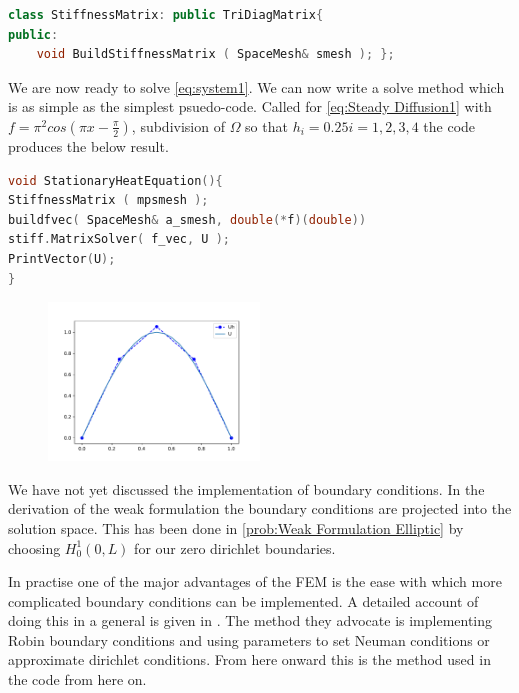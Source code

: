 \documentclass{uonmathreport}
\theoremstyle{definition}
\theoremstyle{problem}
\theoremstyle{theorem}
\begin{document}
\begin{lstlisting}[language=C++]
class StiffnessMatrix: public TriDiagMatrix{
public:
    void BuildStiffnessMatrix ( SpaceMesh& smesh ); };

\end{lstlisting}

We are now ready to solve \ref{eq:system1}. We can now write a solve method which is as simple as the simplest psuedo-code. Called for \ref{eq:Steady Diffusion1} with  $f=\pi^2cos(\pi x - \frac{\pi}{2})$, subdivision of $\Omega$ so that $h_i = 0.25 i=1, 2, 3, 4$   the code produces the below result.\\

\begin{lstlisting}[language=C++]
void StationaryHeatEquation(){
StiffnessMatrix ( mpsmesh );
buildfvec( SpaceMesh& a_smesh, double(*f)(double))
stiff.MatrixSolver( f_vec, U );
PrintVector(U);
}
\end{lstlisting}

\clearpage

\begin{figure}
   \includegraphics[width=0.5\textwidth]{EllipticPDE2.pdf}
   
 \label{fig:eliptic1}
\end{figure}



We have not yet discussed the implementation of boundary conditions. In the derivation of the weak formulation the boundary conditions are projected into the solution space. This has been done in \ref{prob:Weak Formulation Elliptic} by choosing $H^1_0(0, L)$ for our zero dirichlet boundaries.

In practise one of the major advantages of the FEM is the ease with which more complicated boundary conditions can be implemented. A detailed account of doing this in a general is given in \cite{larson2013finite}. The method they advocate is implementing Robin boundary conditions and using parameters to set Neuman conditions or approximate dirichlet conditions. From here onward this is the method used in the code from here on.
\end{document}

